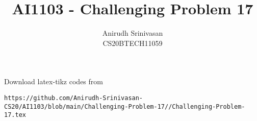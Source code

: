 \documentclass[journal,12pt,twocolumn]{IEEEtran}
\theoremstyle{definition}
\DeclareMathOperator*{\Res}{Res}
\begin{document}
\newcommand{\BEQA}{\begin{eqnarray}}
\newcommand{\EEQA}{\end{eqnarray}}
\newcommand{\define}{\stackrel{\triangle}{=}}

\raggedbottom
\setlength{\parindent}{0pt}
\providecommand{\mbf}{\mathbf}
\providecommand{\pr}[1]{\ensuremath{\Pr\left(#1\right)}}
\providecommand{\qfunc}[1]{\ensuremath{Q\left(#1\right)}}
\providecommand{\sbrak}[1]{\ensuremath{{}\left[#1\right]}}
\providecommand{\lsbrak}[1]{\ensuremath{{}\left[#1\right.}}
\providecommand{\rsbrak}[1]{\ensuremath{{}\left.#1\right]}}
\providecommand{\brak}[1]{\ensuremath{\left(#1\right)}}
\providecommand{\lbrak}[1]{\ensuremath{\left(#1\right.}}
\providecommand{\rbrak}[1]{\ensuremath{\left.#1\right)}}
\providecommand{\cbrak}[1]{\ensuremath{\left\{#1\right\}}}
\providecommand{\lcbrak}[1]{\ensuremath{\left\{#1\right.}}
\providecommand{\rcbrak}[1]{\ensuremath{\left.#1\right\}}}
\theoremstyle{remark}
\newtheorem{rem}{Remark}
\newcommand{\sgn}{\mathop{\mathrm{sgn}}}
\newcommand*{\permcomb}[4][0mu]{{{}^{#3}\mkern#1#2_{#4}}}
\newcommand*{\perm}[1][-3mu]{\permcomb[#1]{P}}
\newcommand*{\comb}[1][-1mu]{\permcomb[#1]{C}}
\providecommand{\abs}[1]{\vert#1\vert}
\providecommand{\res}[1]{\Res\displaylimits_{#1}} 
\providecommand{\norm}[1]{\lVert#1\rVert}
\providecommand{\mtx}[1]{\mathbf{#1}}
\providecommand{\mean}[1]{E[ #1 ]}
\providecommand{\fourier}{\overset{\mathcal{F}}{ \rightleftharpoons}}
\providecommand{\system}{\overset{\mathcal{H}}{ \longleftrightarrow}}
\newcommand{\solution}{\noindent \textbf{Solution: }}
\newcommand{\cosec}{\,\text{cosec}\,}
\providecommand{\dec}[2]{\ensuremath{\overset{#1}{\underset{#2}{\gtrless}}}}
\newcommand{\myvec}[1]{\ensuremath{\begin{pmatrix}#1\end{pmatrix}}}
\newcommand{\mydet}[1]{\ensuremath{\begin{vmatrix}#1\end{vmatrix}}}
\makeatletter
{}
\makeatother
\let\StandardTheFigure\thefigure
\let\vec\mathbf
\renewcommand{\thefigure}{\theproblem}
\def\putbox#1#2#3{\makebox[0in][l]{\makebox[#1][l]{}\raisebox{\baselineskip}[0in][0in]{\raisebox{#2}[0in][0in]{#3}}}}
     \def\rightbox#1{\makebox[0in][r]{#1}}
     \def\centbox#1{\makebox[0in]{#1}}
     \def\topbox#1{\raisebox{-\baselineskip}[0in][0in]{#1}}
     \def\midbox#1{\raisebox{-0.5\baselineskip}[0in][0in]{#1}}
\vspace{3cm}
\title{AI1103 - Challenging Problem 17}
\author{Anirudh Srinivasan\\CS20BTECH11059}
\maketitle
\newpage
\bigskip
\renewcommand{\thefigure}{\theenumi}
\renewcommand{\thetable}{\theenumi}
Download latex-tikz codes from 
%
\begin{lstlisting}
https://github.com/Anirudh-Srinivasan-CS20/AI1103/blob/main/Challenging-Problem-17//Challenging-Problem-17.tex
\end{lstlisting}
\end{document}
